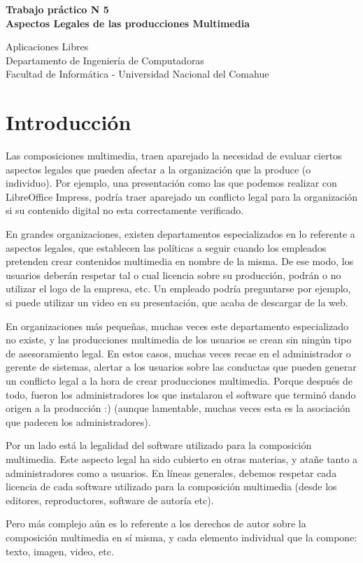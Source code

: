 \documentclass[12pt]{article}
\def\maketitle{

 \makeatletter
 {\color{bl} \centering \huge \sc \textbf{
Trabajo práctico N 5 \\
\large \vspace*{-8pt} \color{black} Aspectos Legales de las producciones Multimedia 
 \vspace*{8pt} }\par}
 \makeatother


 \makeatletter
 {\centering \small 
	Aplicaciones Libres\\
 	Departamento de Ingeniería de Computadoras \\
 	Facultad de Informática - Universidad Nacional del Comahue \\
 	\vspace{20pt} }
 \makeatother

}
\begin{document}
\thispagestyle{empty}
\maketitle
\setlength{\parindent}{0pt}


\section*{Introducción}


Las composiciones multimedia, traen aparejado la necesidad de evaluar ciertos
aspectos legales que pueden afectar a la organización que la produce (o 
individuo). Por ejemplo, una presentación como las que podemos realizar con 
LibreOffice Impress, podría traer aparejado un conflicto legal para la 
organización si su contenido digital no esta correctamente verificado. 

En grandes organizaciones, existen departamentos especializados en lo referente 
a aspectos legales, que establecen las políticas a seguir cuando los empleados 
pretenden crear contenidos multimedia en nombre de la misma. De ese modo,
los usuarios deberán respetar tal o cual licencia sobre su producción, podrán o 
no utilizar el logo de la empresa, etc. Un empleado podría preguntarse por 
ejemplo, si puede utilizar un video en su presentación, que acaba de descargar
de la web.  

En organizaciones más pequeñas, muchas veces este departamento especializado no
existe, y las producciones multimedia de los usuarios se crean sin ningún tipo 
de asesoramiento legal. En estos casos, muchas veces recae en el administrador
o gerente de sistemas, alertar a los usuarios sobre las conductas que pueden 
generar un conflicto legal a la hora de crear producciones multimedia. Porque 
después de todo, fueron los administradores los que instalaron el software que
terminó dando origen a la producción :) (aunque lamentable, muchas veces esta 
es la asociación que padecen los administradores). 

Por un lado está la legalidad del software utilizado para la composición 
multimedia. Este aspecto legal ha sido cubierto en otras materias, y atañe
tanto a administradores como a usuarios. En líneas generales, debemos respetar
cada licencia de cada software utilizado para la composición multimedia 
(desde los editores, reproductores, software de autoría etc). 

Pero más complejo aún es lo referente a los derechos de autor sobre la 
composición multimedia en sí misma, y cada elemento individual que la 
compone: texto, imagen, video, etc. 
\end{document}
